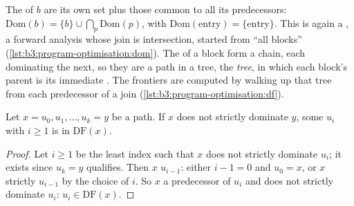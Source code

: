 The  of $b$ are its own set plus those common to all its predecessors: $\mathrm{Dom}(b) = \{b\} \cup \bigcap_{p} \mathrm{Dom}(p)$, with $\mathrm{Dom}(\mathrm{entry}) = \{\mathrm{entry}\}$. This is again a , a forward analysis whose join is intersection, started from ``all blocks'' (\cref{lst:b3:program-optimisation:dom}). The  of a block form a chain, each dominating the next, so they are a path in a tree, the \emph{ tree}, in which each block's parent is its immediate . The frontiers are computed by walking up that tree from each predecessor of a join (\cref{lst:b3:program-optimisation:df}).

\label{lst:b3:program-optimisation:dom}

\label{lst:b3:program-optimisation:df}

\begin{lemma}\label{lem:b3:program-optimisation:leave}
Let $x = u_0, u_1, \dots, u_k = y$ be a path. If $x$ does not strictly dominate $y$, some $u_i$ with $i \ge 1$ is in $\mathrm{DF}(x)$.
\end{lemma}

\begin{proof}
Let $i \ge 1$ be the least index such that $x$ does not strictly dominate $u_i$; it exists since $u_k = y$ qualifies. Then $x$  $u_{i-1}$: either $i - 1 = 0$ and $u_0 = x$, or $x$ strictly  $u_{i-1}$ by the choice of $i$. So $x$  a predecessor of $u_i$ and does not strictly dominate $u_i$: $u_i \in \mathrm{DF}(x)$.
\end{proof}


